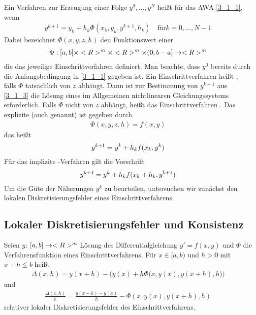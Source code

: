 Ein Verfahren zur Erzeugung einer Folge $y^0,...,y^N$ heißt  für das AWA \cref{3_1_1}, wenn
\begin{align}
	\label{3_1_3}
	y^{k+1} = y_k + h_k\Phi(x_k,y_k,y^{k+1},h_k) \quad\text{für} k=0,...,N-1
\end{align}
Dabei bezeichnet $\Phi(x,y,z,h)$ den Funktionswert einer 
\begin{align}
	\Phi: [a,b]\times<R>^m\times <R>^m\times (0,b-a]\to <R>^m\notag
\end{align}
die das jeweilige Einschrittverfahren definiert. Man beachte, dass $y^0$ bereits durch die Anfangsbedingung in \cref{3_1_1} gegeben ist. Ein Einschrittverfahren heißt , falls $\Phi$ tatsächlich von $z$ abhängt. Dann ist zur Bestimmung von $y^{k+1}$ aus \cref{3_1_3} die Lösung eines im Allgemeinen nichtlinearen Gleichungssystems erforderlich. Falls $\Phi$ nicht von $z$ abhängt, heißt das Einschrittverfahren . Das explizite  (auch  genannt) ist gegeben durch
\begin{align}
	\label{3_1_4}
	\Phi(x,y,z,h) = f(x,y)
\end{align}
das heißt
\begin{align}
	y^{k+1} = y^k + h_kf(x_k,y^k) \notag
\end{align}
Für das implizite -Verfahren gilt die Vorschrift
\begin{align}
	y^{k+1} = y^k + h_kf(x_k + h_k,y^{k+1}) \notag
\end{align}
Um die Güte der Näherungen $y^k$ zu beurteilen, untersuchen wir zunächst den lokalen Diskretisierungsfehler eines Einschrittverfahrens.

\subsection{Lokaler Diskretisierungsfehler und Konsistenz}

\begin{definition}
	Seien $y$: $[a,b]\to <R>^m$ Lösung des Differentialgleichung $y'=f(x,y)$ und $\Phi$ die Verfahrensfunktion eines Einschrittverfahrens. Für $x\in[a,b)$ und $h>0$ mit $x+h\le b$ heißt
	\begin{align}
		\label{3_1_5}
		\Delta(x,h) = y(x+h) - \bigg( y(x) + h\Phi\big(x,y(x),y(x+h),h\big)\bigg)
	\end{align}
	 und 
	\begin{align}
		\frac{\Delta(x,h)}{h} = \frac{y(x+h)-y(x)}{h} - \Phi(x,y(x),y(x+h),h)
	\end{align}
	relativer lokaler Diskretisierungsfehler des Einschrittverfahrens.
\end{definition}

